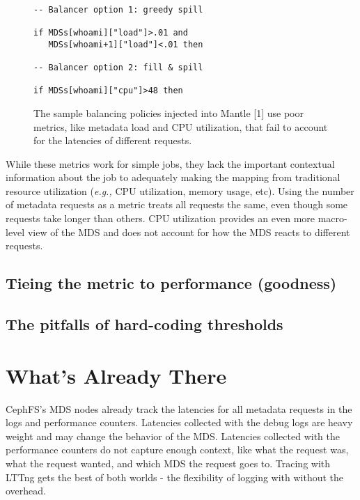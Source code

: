 \documentclass[conference]{acm_proc_article-sp} \usepackage[english]{babel}
\begin{document}
\begin{figure}
\begin{verbatim} 

-- Balancer option 1: greedy spill

if MDSs[whoami]["load"]>.01 and 
   MDSs[whoami+1]["load"]<.01 then
   
-- Balancer option 2: fill & spill 

if MDSs[whoami]["cpu"]>48 then 

\end{verbatim}
\caption{The sample balancing policies injected into Mantle [1] use poor
metrics, like metadata load and CPU utilization, that fail to account for the
latencies of different requests.\label{listing:balancers}}
\end{figure}


While these metrics work for simple jobs, they lack the important contextual
information about the job to adequately making the mapping from traditional
resource utilization ({\it e.g.,} CPU utilization, memory usage, etc). Using
the number of metadata requests as a metric treats all requests the same, even
though some requests take longer than others. CPU utilization provides an even
more macro-level view of the MDS and does not account for how the MDS reacts to
different requests. 

\subsection{Tieing the metric to performance (goodness)}

\subsection{The pitfalls of hard-coding thresholds}

\section{What's Already There}


CephFS's MDS nodes already track the latencies for all metadata requests in the
logs and  performance counters. Latencies collected with the debug logs are
heavy weight and may change the behavior of the MDS. Latencies collected with
the performance counters do not capture enough context, like what the request
was, what the request wanted, and which MDS the request goes to.  Tracing with
LTTng gets the best of both worlds - the flexibility of logging with without
the overhead. 
\end{document}
